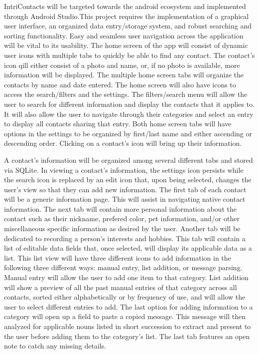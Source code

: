 \documentclass[man, 11pt, a4paper, biblatex]{apa6}
\begin{document}
  IntriContacts will be targeted towards the android ecosystem and implemented through Android Studio.This project requires the implementation of a graphical user interface, an organized data entry/storage system, and robust searching and sorting functionality. Easy and seamless user navigation across the application will be vital to its usability. The home screen of the app will consist of dynamic user icons with multiple tabs to quickly be able to find any contact. The contact’s icon qill either consist of a photo and name, or, if no photo is available, more information will be displayed. The multiple home screen tabs will organize the contacts by name and date entered. The home screen will also have icons to access the search/filters and the settings. The filters/search menu will allow the user to search for different information and display the contacts that it applies to. It will also allow the user to navigate through their categories and select an entry to display all contacts sharing that entry. Both home screen tabs will have options in the settings to be organized by first/last name and either ascending or descending order. Clicking on a contact’s icon will bring up their information.

  A contact’s information will be organized among several different tabs and stored via SQLite. In viewing a contact’s information, the settings icon persists while the search icon is replaced by an edit icon that, upon being selected, changes the user’s view so that they can add new information. The first tab of each contact will be a generic information page. This will assist in navigating native contact information. The next tab will contain more personal information about the contact such as their nickname, prefered color, pet information, and/or other miscellaneous specific information as desired by the user. Another tab will be dedicated to recording a person’s interests and hobbies. This tab will contain a list of editable data fields that, once selected, will display its applicable data as a list. This list view will have three different icons to add information in the following three different ways: manual entry, list addition, or message parsing. Manual entry will allow the user to add one item to that category. List addition will show a preview of all the past manual entries of that category across all contacts, sorted either alphabetically or by frequency of use, and will allow the user to select different entries to add. The last option for adding information to a category will open up a field to paste a copied message. This message will then analyzed for applicable nouns listed in short succession to extract and present to the user before adding them to the category’s list. The last tab features an open note to catch any missing details.
\end{document}
